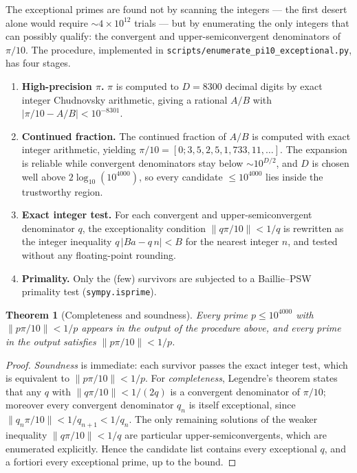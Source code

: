 \documentclass[11pt,letterpaper]{article}
\newtheorem{theorem}{Theorem}[section]
\theoremstyle{definition}
\begin{document}
The exceptional primes are found not by scanning the integers --- the first
desert alone would require $\sim 4\times10^{12}$ trials --- but by enumerating
the only integers that can possibly qualify: the convergent and
upper-semiconvergent denominators of $\pi/10$.  The procedure, implemented in
\texttt{scripts/enumerate\_pi10\_exceptional.py}, has four stages.

\begin{enumerate}
\item \textbf{High-precision $\pi$.}  $\pi$ is computed to $D = 8300$ decimal
  digits by exact integer Chudnovsky arithmetic, giving a rational
  $A/B$ with $|\pi/10 - A/B| < 10^{-8301}$.
\item \textbf{Continued fraction.}  The continued fraction of $A/B$ is computed
  with exact integer arithmetic, yielding $\pi/10 = [0;3,5,2,5,1,733,11,\ldots]$.
  The expansion is reliable while convergent denominators stay below
  $\sim 10^{D/2}$, and $D$ is chosen well above $2\log_{10}(10^{4000})$, so every
  candidate $\le 10^{4000}$ lies inside the trustworthy region.
\item \textbf{Exact integer test.}  For each convergent and upper-semiconvergent
  denominator $q$, the exceptionality condition $\|q\pi/10\| < 1/q$ is rewritten
  as the integer inequality $q\,|B a - q\,n| < B$ for the nearest integer $n$,
  and tested without any floating-point rounding.
\item \textbf{Primality.}  Only the (few) survivors are subjected to a
  Baillie--PSW primality test (\texttt{sympy.isprime}).
\end{enumerate}

\begin{theorem}[Completeness and soundness]\label{thm:complete}
Every prime $p \le 10^{4000}$ with $\|p\pi/10\| < 1/p$ appears in the output of
the procedure above, and every prime in the output satisfies $\|p\pi/10\| < 1/p$.
\end{theorem}
\begin{proof}
\emph{Soundness} is immediate: each survivor passes the exact integer test, which
is equivalent to $\|p\pi/10\|<1/p$.  For \emph{completeness}, Legendre's theorem
states that any $q$ with $\|q\pi/10\| < 1/(2q)$ is a convergent denominator of
$\pi/10$; moreover every convergent denominator $q_n$ is itself exceptional,
since $\|q_n\pi/10\| < 1/q_{n+1} < 1/q_n$.  The only remaining solutions of the
weaker inequality $\|q\pi/10\|<1/q$ are particular upper-semiconvergents, which
are enumerated explicitly.  Hence the candidate list contains every exceptional
$q$, and a fortiori every exceptional prime, up to the bound.
\end{proof}
\end{document}

